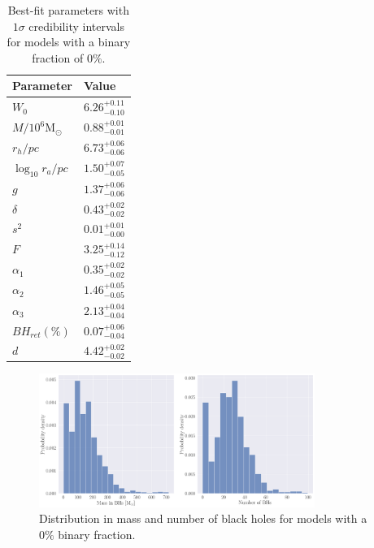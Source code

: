 \begin{table}
	\centering
	\caption{Best-fit parameters with $1\sigma$ credibility intervals for models with a binary fraction of $0\%$.}
	\begin{tabular}{l l}

		\hline
		Parameter                 & Value                  \\
		\hline
		$W_0$                     & $6.26^{+0.11}_{-0.10}$ \\
		$M/10^6 \mathrm{M}_\odot$ & $0.88^{+0.01}_{-0.01}$ \\
		$r_h / pc$                & $6.73^{+0.06}_{-0.06}$ \\
		$\log_{10}{r_a / pc}$     & $1.50^{+0.07}_{-0.05}$ \\
		$g$                       & $1.37^{+0.06}_{-0.06}$ \\
		$\delta$                  & $0.43^{+0.02}_{-0.02}$ \\
		$s^2$                     & $0.01^{+0.01}_{-0.00}$ \\
		$F$                       & $3.25^{+0.14}_{-0.12}$ \\
		$\alpha_1$                & $0.35^{+0.02}_{-0.02}$ \\
		$\alpha_2$                & $1.46^{+0.05}_{-0.05}$ \\
		$\alpha_3$                & $2.13^{+0.04}_{-0.04}$ \\
		$BH_{ret} (\%)$           & $0.07^{+0.06}_{-0.04}$ \\
		$d$                       & $4.42^{+0.02}_{-0.02}$ \\
		\hline
	\end{tabular}
	\label{tab:parameters_nobin}
\end{table}

\begin{figure}
	\centering
	\includegraphics[width=0.8\textwidth]{figures/prev_nobin/BH_dists.png}
	\caption{Distribution in mass and number of black holes for models with a $0\%$ binary
		fraction.}
	\label{fig:prev_nobin_BH_dists}
\end{figure}


